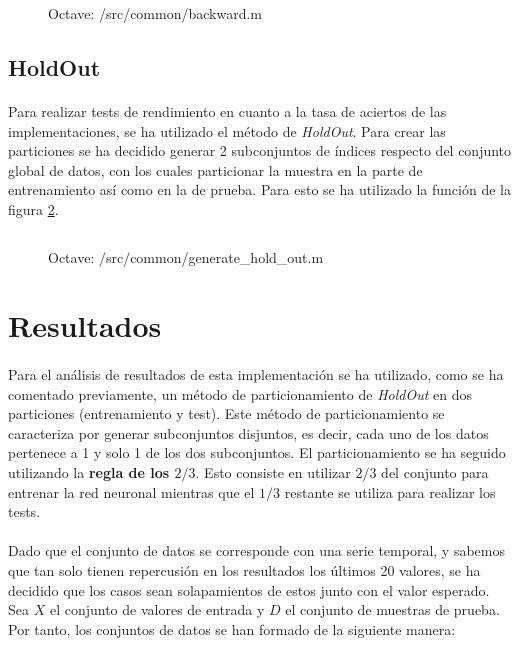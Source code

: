 \documentclass[10pt, a4paper,spanish]{article}
\begin{document}
			\begin{figure}[htpb!]
				\centering
				\inputminted{octave}{../src/common/backward.m}
				\caption{Octave: /src/common/backward.m}
				\label{code:backward}
			\end{figure}


		\subsection{HoldOut}
			\paragraph{}
			Para realizar tests de rendimiento en cuanto a la tasa de aciertos de las implementaciones, se ha utilizado el método de \emph{HoldOut}. Para crear las particiones se ha decidido generar 2 subconjuntos de índices respecto del conjunto global de datos, con los cuales particionar la muestra en la parte de entrenamiento así como en la de prueba. Para esto se ha utilizado la función de la figura \ref{code:generate_hold_out}.

			\begin{figure}[htpb!]
				\centering
				\inputminted{octave}{../src/common/generate_hold_out.m}
				\caption{Octave: /src/common/generate\_hold\_out.m}
				\label{code:generate_hold_out}
			\end{figure}

	\section{Resultados}

		\paragraph{}
		Para el análisis de resultados de esta implementación se ha utilizado, como se ha comentado previamente, un método de particionamiento de \emph{HoldOut} en dos particiones (entrenamiento y test). Este método de particionamiento se caracteriza por generar subconjuntos disjuntos, es decir, cada uno de los datos pertenece a 1 y solo 1 de los dos subconjuntos. El particionamiento se ha seguido utilizando la \textbf{regla de los $2/3$}. Esto consiste en utilizar $2/3$ del conjunto para entrenar la red neuronal mientras que el $1/3$ restante se utiliza para realizar los tests.

		\paragraph{}
		Dado que el conjunto de datos se corresponde con una serie temporal, y sabemos que tan solo tienen repercusión en los resultados los últimos 20 valores, se ha decidido que los casos sean solapamientos de estos junto con el valor esperado. Sea $X$ el conjunto de valores de entrada y $D$ el conjunto de muestras de prueba. Por tanto, los conjuntos de datos se han formado de la siguiente manera:
\end{document}
